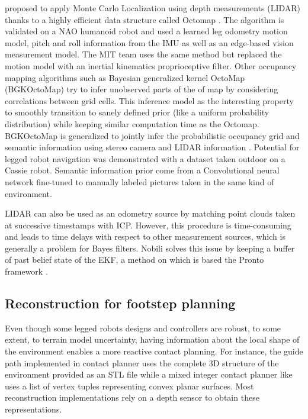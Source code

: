 \cite{hornung2014monte} proposed to apply Monte Carlo Localization using depth measurements (LIDAR) thanks to a highly efficient data structure called Octomap \cite{hornung2013octomap}.
The algorithm is validated on a NAO humanoid robot and used a learned leg odometry motion model, pitch and roll information from the IMU as well as an edge-based vision measurement model.
The MIT team \cite{fallon2014drift} uses the same method but replaced the motion model with an inertial kinematics proprioceptive filter. Other occupancy mapping algorithms 
such as Bayesian generalized kernel OctoMap (BGKOctoMap) \cite{doherty2017bayesian} try to infer unobserved parts of the of map by considering correlations between grid cells. This inference model
as the interesting property to smoothly transition to sanely defined prior (like a uniform probability distribution) while keeping similar computation time as the Octomap.
BGKOctoMap is generalized to jointly infer the probabilistic occupancy grid and semantic information using stereo camera and LIDAR information \cite{gan2020bayesian}. 
Potential for legged robot navigation was demonstrated with a dataset taken outdoor on a Cassie robot.  
Semantic information prior come from a Convolutional neural network fine-tuned to manually labeled pictures taken in the same kind of environment.


LIDAR can also be used as an odometry source by matching point clouds taken at successive timestamps with ICP. However, this procedure is time-consuming 
and leads to time delays with respect to other measurement sources, which is generally a problem for Bayes filters. 
Nobili \cite{nobili2017heterogeneous} solves this issue by keeping a buffer of past belief state of the EKF, a method on which is 
based the Pronto framework \cite{camurri2020pronto}.




\subsection{Reconstruction for footstep planning}
Even though some legged robots designs and controllers \cite{reher2019dynamic, bledt2018cheetah} are robust, to some extent, to terrain model uncertainty, having information about the local
shape of the environment enables a more reactive contact planning. For instance, the guide path implemented in contact planner \cite{tonneau2018efficient} uses the complete 3D structure of the environment
provided as an STL file while a mixed integer contact planner like \cite{tonneau2020sl1m} uses a list of vertex tuples representing convex planar surfaces.
Most reconstruction implementations rely on a depth sensor to obtain these representations.

